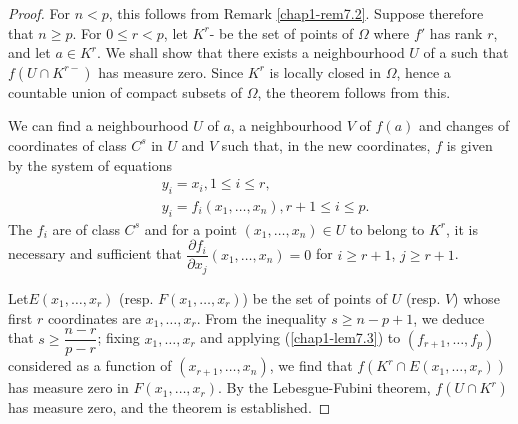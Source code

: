 \begin{proof}
For $n<p$, this follows from Remark \ref{chap1-rem7.2}. Suppose therefore that $n\geq p$. For $0\leq r<p$, let $K^{r}$- be the set of points of $\Omega$ where $f'$ has rank $r$, and let $a\in K^{r}$. We shall show that there exists a neighbourhood $U$ of a such that $f(U\cap K^{r-})$ has measure zero. Since $K^{r}$ is locally closed in $\Omega$, hence a countable union of compact subsets of $\Omega$, the theorem follows from this.

We can find a neighbourhood $U$ of $a$, a neighbourhood $V$ of $f(a)$ and changes of coordinates of class $C^{s}$ in $U$ and $V$ such that, in the new coordinates, $f$ is given by the system of equations
\begin{align*}
& y_{i}=x_{i}, 1\leq i\leq r,\\
& y_{i}=f_{i}(x_{1},\ldots,x_{n}),r+1\leq i\leq p.
\end{align*}
The $f_{i}$ are of class $C^{s}$ and for a point $(x_{1},\ldots,x_{n})\in U$ to belong to $K^{r}$, it is necessary and sufficient that $\dfrac{\partial f_{i}}{\partial x_{j}}(x_{1},\ldots,x_{n})=0$ for $i\geq r+1$, $j\geq r+1$.

\eject

Let\pageoriginale $E(x_{1},\ldots,x_{r})$ (resp. $F(x_{1},\ldots,x_{r})$) be the set of points of $U$ (resp. $V$) whose first $r$ coordinates are $x_{1},\ldots,x_{r}$. From the inequality $s\geq n-p+1$, we deduce that $s\geq \dfrac{n-r}{p-r}$; fixing $x_{1},\ldots,x_{r}$ and applying (\ref{chap1-lem7.3}) to $(f_{r+1},\ldots,f_{p})$ considered as a function of $(x_{r+1},\ldots,x_{n})$, we find that $f(K^{r}\cap E(x_{1},\ldots,x_{r}))$ has measure zero in $F(x_{1},\ldots,x_{r})$. By the Lebesgue-Fubini theorem, $f(U\cap K^{r})$ has measure zero, and the theorem is established.
\end{proof}

